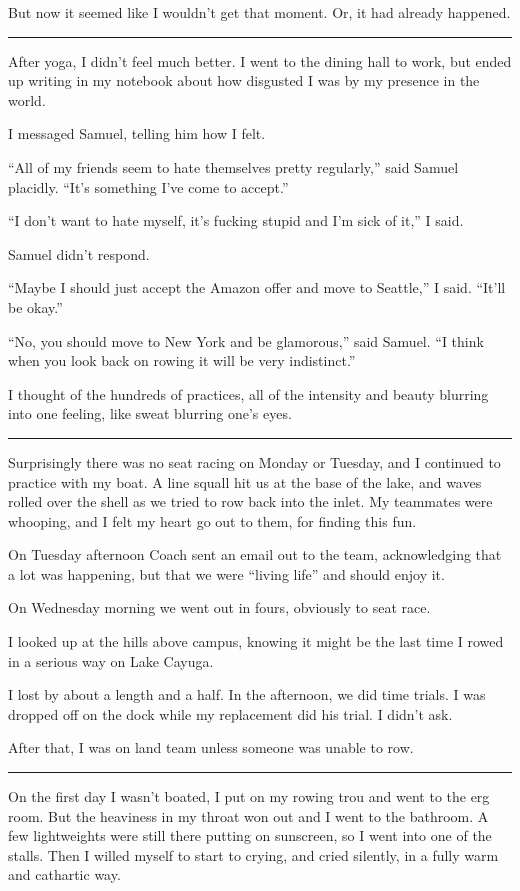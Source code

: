 But now it seemed like I wouldn't get that moment.  Or, it had already happened.

\plainfancybreak{12pt}{2}{* * *}

After yoga, I didn't feel much better.  I went to the dining hall to work, but
ended up writing in my notebook about how disgusted I was by my presence in the
world.

I messaged Samuel, telling him how I felt.

``All of my friends seem to hate themselves pretty regularly,'' said Samuel
placidly.  ``It's something I've come to accept.''

``I don't want to hate myself, it's fucking stupid and I'm sick of it,'' I said.  

Samuel didn't respond.

``Maybe I should just accept the Amazon offer and move to Seattle,'' I said.
``It'll be okay.''

``No, you should move to New York and be glamorous,'' said Samuel.  ``I think
when you look back on rowing it will be very indistinct.'' 

I thought of the hundreds of practices, all of the intensity and beauty blurring
into one feeling, like sweat blurring one's eyes.

\plainfancybreak{12pt}{2}{* * *}

Surprisingly there was no seat racing on Monday or Tuesday, and I continued to
practice with my boat.  A line squall hit us at the base of the lake, and waves
rolled over the shell as we tried to row back into the inlet.  My teammates were
whooping, and I felt my heart go out to them, for finding this fun.

On Tuesday afternoon Coach sent an email out to the team, acknowledging that a
lot was happening, but that we were ``living life'' and should enjoy it.

On Wednesday morning we went out in fours, obviously to seat race.

I looked up at the hills above campus, knowing it might be the last time I rowed
in a serious way on Lake Cayuga.  

I lost by about a length and a half.  In the afternoon, we did time trials.  I
was dropped off on the dock while my replacement did his trial.  I didn't ask.

After that, I was on land team unless someone was unable to row.
 
\plainfancybreak{12pt}{2}{* * *}

On the first day I wasn't boated, I put on my rowing trou and went to the erg
room.  But the heaviness in my throat won out and I went to the bathroom.  A few
lightweights were still there putting on sunscreen, so I went into one of the
stalls.  Then I willed myself to start to crying, and cried silently, in a fully
warm and cathartic way.  


